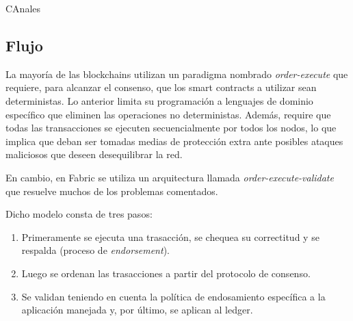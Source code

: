 CAnales


 
\subsection{Flujo}

La mayor\'ia de las blockchains utilizan un paradigma nombrado \emph{order-execute} que requiere, para alcanzar el consenso, que los smart contracts a utilizar sean deterministas. Lo anterior limita su programaci\'on a lenguajes de dominio espec\'ifico que eliminen las operaciones no deterministas. Adem\'as, require que todas las transacciones se ejecuten secuencialmente por todos los nodos, lo que implica que deban ser tomadas medias de protecci\'on extra ante posibles ataques maliciosos que deseen desequilibrar la red.

En cambio, en Fabric se utiliza un arquitectura llamada \emph{order-execute-validate} que resuelve muchos de los problemas comentados.

Dicho modelo consta de tres pasos:
\begin{enumerate}
	\item Primeramente se ejecuta una trasacci\'on, se chequea su correctitud y se respalda (proceso de \emph{endorsement}).
	
	\item Luego se ordenan las trasacciones a partir del protocolo de consenso.
	
	\item Se validan teniendo en cuenta la pol\'itica de endosamiento espec\'ifica a la aplicaci\'on manejada y, por \'ultimo, se aplican al ledger.
\end{enumerate}

